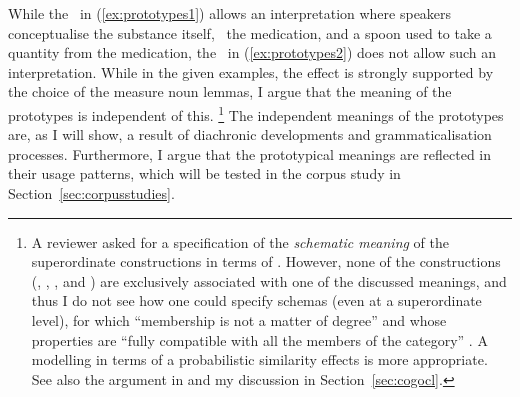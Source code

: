 While the \PGCd\ in (\ref{ex:prototypes1}) allows an interpretation where speakers conceptualise the substance itself, \ie\ the medication, and a spoon used to take a quantity from the medication, the \NACb\ in (\ref{ex:prototypes2}) does not allow such an interpretation.
While in the given examples, the effect is strongly supported by the choice of the measure noun lemmas, I argue that the meaning of the prototypes is independent of this.%
\footnote{A reviewer asked for a specification of the \textit{schematic meaning} of the superordinate constructions in terms of \citet{Langacker1987}.
However, none of the constructions (\PGCd, \PGCa, \NACb, and \NACa) are exclusively associated with one of the discussed meanings, and thus I do not see how one could specify schemas (even at a superordinate level), for which ``membership is not a matter of degree'' and whose properties are ``fully compatible with all the members of the category'' \citep[371]{Langacker1987}.
A modelling in terms of a probabilistic similarity effects is more appropriate.
See also the argument in \citet[70--71]{Taylor2003} and my discussion in Section~\ref{sec:cogocl}.}
The independent meanings of the prototypes are, as I will show, a result of diachronic developments and grammaticalisation processes.
Furthermore, I argue that the prototypical meanings are reflected in their usage patterns, which will be tested in the corpus study in Section~\ref{sec:corpusstudies}.

